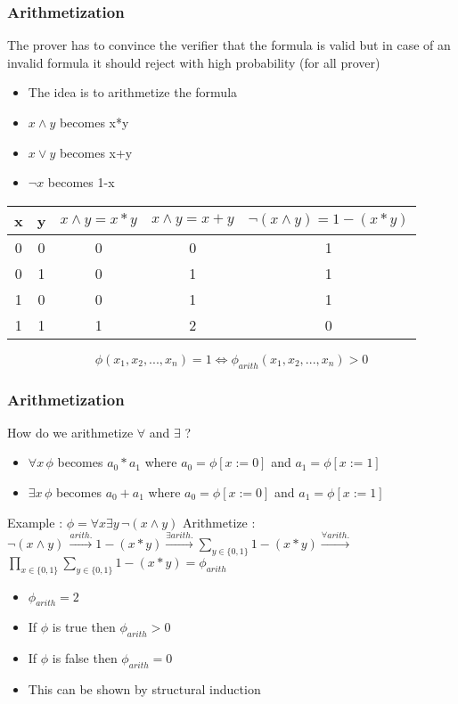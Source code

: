 \documentclass[hyperref={pdfpagelabels=false},t,10pt]{beamer}
\begin{document}
\begin{frame}
  \frametitle{Arithmetization}
  The prover has to convince the verifier that the formula is valid but in case of 
  an invalid formula it should reject with high probability (for all prover) \newline \pause

  \begin{itemize}
    \item The idea is to arithmetize the formula \pause
    \item $x \land y$ becomes x*y
    \item $x \lor y$ becomes x+y
    \item $\neg x$ becomes 1-x \pause
  \end{itemize}
    \begin{tabular}{|c|c|c|c|c|}
      \hline
      x & y & $x\land y = x*y$& $x\land y = x+y $ &$\neg (x\land y) = 1- (x * y)$ \\ 
      \hline
      0 & 0 & 0 & 0 & 1\\ 
      0 & 1 & 0 & 1 & 1\\
      1 & 0 & 0 & 1 & 1\\
      1 & 1 & 1 & 2 & 0\\ 
    \end{tabular}
    $$\phi(x_1,x_2,...,x_n) = 1 \Leftrightarrow \phi_{arith}(x_1,x_2,...,x_n) > 0$$
\end{frame}

\begin{frame}
  \frametitle{Arithmetization}
  How do we arithmetize $\forall$ and $\exists$ ?  \newline
  \pause 

  \begin{itemize}
    \item $\forall x \, \phi$ becomes $a_0 * a_1$ where $a_0 = \phi[x := 0]$ and $a_1 = \phi[x := 1]$ 
    \pause
    \item $\exists x \, \phi$ becomes $a_0 + a_1$ where $a_0 = \phi[x := 0]$ and $a_1 = \phi[x := 1]$  
    \pause
  \end{itemize}
  Example : $\phi = \forall x \exists y \, \neg (x \land y)$ \newline \pause 
  Arithmetize : $\neg (x \land y) \, \xrightarrow{arith.} 1-(x * y) \xrightarrow{\exists arith.} \sum_{y \in \{0,1\}}^{} 1-(x*y) \xrightarrow{\forall arith.}$ \pause \newline 
  $\prod_{x \in \{0,1\}}^{} \sum_{y \in \{0,1\}} 1- (x*y) = \phi_{arith}$ \newline

  \begin{itemize}
    \item $\phi_{arith} = 2$ \pause
    \item If $\phi$ is true then $\phi_{arith} > 0$
    \item If $\phi$ is false then $\phi_{arith} = 0$ \pause
    \item This can be shown by structural induction 
  \end{itemize}
\end{frame}
\end{document}
